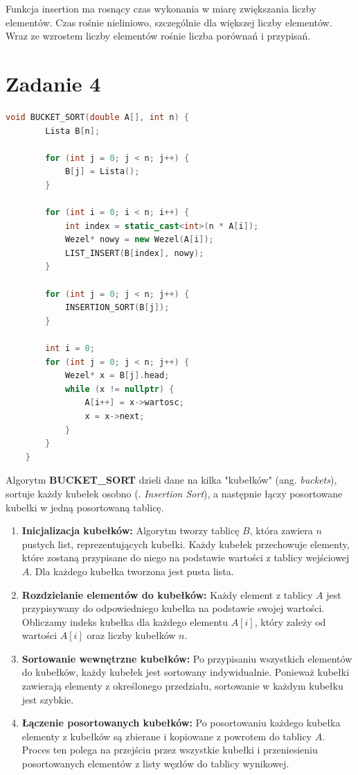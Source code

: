 \documentclass{article}
\begin{document}
			Funkcja insertion ma rosnący czas wykonania w miarę zwiększania liczby elementów. Czas rośnie nieliniowo, szczególnie dla większej liczby elementów. Wraz ze wzrostem liczby elementów rośnie liczba porównań i przypisań.
			
			\newpage
			\section*{Zadanie 4}
			
			\begin{lstlisting}[language=C++, tabsize=3] 
	void BUCKET_SORT(double A[], int n) {
		Lista B[n]; 
		
		for (int j = 0; j < n; j++) {
			B[j] = Lista();
		}
		
		for (int i = 0; i < n; i++) {
			int index = static_cast<int>(n * A[i]); 
			Wezel* nowy = new Wezel(A[i]);   
			LIST_INSERT(B[index], nowy);    
		}
		
		for (int j = 0; j < n; j++) {
			INSERTION_SORT(B[j]);
		}
		
		int i = 0;
		for (int j = 0; j < n; j++) {
			Wezel* x = B[j].head;
			while (x != nullptr) {
				A[i++] = x->wartosc; 
				x = x->next;
			}
		}
	}
			\end{lstlisting}
			
			Algorytm \textbf{BUCKET\_SORT} dzieli dane na kilka "kubełków" (ang. \textit{buckets}), sortuje każdy kubełek osobno (. \textit{Insertion Sort}), a następnie łączy posortowane kubełki w jedną posortowaną tablicę.
			
			\begin{enumerate}
				\item \textbf{Inicjalizacja kubełków:}
				Algorytm tworzy tablicę \( B \), która zawiera \( n \) pustych list, reprezentujących kubełki. Każdy kubełek przechowuje elementy, które zostaną przypisane do niego na podstawie wartości z tablicy wejściowej \( A \). Dla każdego kubełka tworzona jest pusta lista.
				
				\item \textbf{Rozdzielanie elementów do kubełków:}
				Każdy element z tablicy \( A \) jest przypisywany do odpowiedniego kubełka na podstawie swojej wartości. Obliczamy indeks kubełka dla każdego elementu \( A[i] \), który zależy od wartości \( A[i] \) oraz liczby kubełków \( n \).
				
				\item \textbf{Sortowanie wewnętrzne kubełków:}
				Po przypisaniu wszystkich elementów do kubełków, każdy kubełek jest sortowany indywidualnie. Ponieważ kubełki zawierają elementy z określonego przedziału, sortowanie w każdym kubełku jest szybkie.
				
				\item \textbf{Łączenie posortowanych kubełków:}
				Po posortowaniu każdego kubełka elementy z kubełków są zbierane i kopiowane z powrotem do tablicy \( A \). Proces ten polega na przejściu przez wszystkie kubełki i przeniesieniu posortowanych elementów z listy węzłów do tablicy wynikowej.
			\end{enumerate}
			
\end{document}
